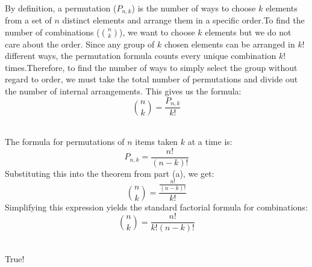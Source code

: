 \documentclass[12pt]{article}
\begin{document}
\begin{enumerate}

\\
By definition, a permutation ($P_{n,k}$) is the number of ways to choose $k$ elements from a set of $n$ distinct elements and arrange them in a specific order.To find the number of combinations ($\binom{n}{k}$), we want to choose $k$ elements but we do not care about the order. Since any group of $k$ chosen elements can be arranged in $k!$ different ways, the permutation formula counts every unique combination $k!$ times.Therefore, to find the number of ways to simply select the group without regard to order, we must take the total number of permutations and divide out the number of internal arrangements. This gives us the formula:$$\binom{n}{k} = \frac{P_{n,k}}{k!}$$

\\The formula for permutations of $n$ items taken $k$ at a time is:$$P_{n,k} = \frac{n!}{(n-k)!}$$Substituting this into the theorem from part (a), we get:$$\binom{n}{k} = \frac{\frac{n!}{(n-k)!}}{k!}$$Simplifying this expression yields the standard factorial formula for combinations:$$\binom{n}{k} = \frac{n!}{k!(n-k)!}$$

\\
True!
\newpage
{}
\end{enumerate}
\end{document}

